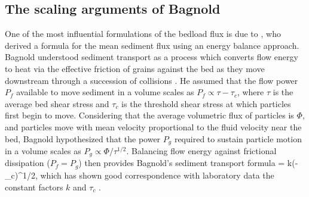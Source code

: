\subsection{The scaling arguments of Bagnold}
\label{sec:baggo}

One of the most influential formulations of the bedload flux is due to \citet{Bagnold1956,Bagnold1966}, who derived a formula for the mean sediment flux using an energy balance approach.
Bagnold understood sediment transport as a process which converts flow energy to heat via the effective friction \DIFdelbegin {}\DIFdelend \DIFaddbegin {}\DIFaddend of grains against the bed as they move downstream through a succession of collisions \citep{Bagnold1973}.
He assumed that the flow power $P_f$ available to move sediment in a volume scales as $P_f \propto \tau - \tau_c$, where $\tau$ is the average bed shear stress and $\tau_c$ is the threshold shear stress at which particles first begin to move. 
Considering that the average volumetric flux of particles is $\Phi$, and particles move with mean velocity proportional to the fluid velocity near the bed, Bagnold hypothesized that the power $P_g$ required to sustain particle motion in a volume scales as $P_g \propto \Phi/\tau^{1/2}.$
Balancing flow energy against frictional dissipation ($P_f = P_g$) then provides Bagnold's sediment transport formula
\be \Phi = k(\tau-\tau_c)\tau^{1/2}, \label{eq:bagnold}\ee
which has shown good correspondence with laboratory data \DIFdelbegin {}\DIFdelend \DIFaddbegin {}\DIFaddend the constant factors $k$ and $\tau_c$ \DIFaddbegin {}\DIFaddend .


